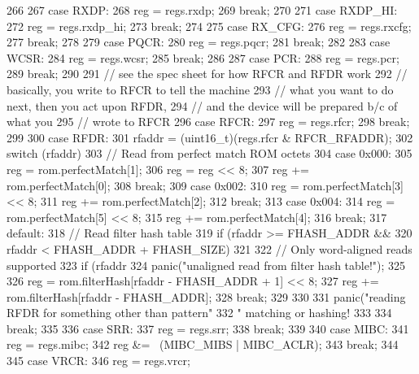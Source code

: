 \begin{DoxyCode}
{{266 
267           case RXDP:
268             reg = regs.rxdp;
269             break;
270 
271           case RXDP_HI:
272             reg = regs.rxdp_hi;
273             break;
274 
275           case RX_CFG:
276             reg = regs.rxcfg;
277             break;
278 
279           case PQCR:
280             reg = regs.pqcr;
281             break;
282 
283           case WCSR:
284             reg = regs.wcsr;
285             break;
286 
287           case PCR:
288             reg = regs.pcr;
289             break;
290 
291             // see the spec sheet for how RFCR and RFDR work
292             // basically, you write to RFCR to tell the machine
293             // what you want to do next, then you act upon RFDR,
294             // and the device will be prepared b/c of what you
295             // wrote to RFCR
296           case RFCR:
297             reg = regs.rfcr;
298             break;
299 
300           case RFDR:
301             rfaddr = (uint16_t)(regs.rfcr & RFCR_RFADDR);
302             switch (rfaddr) {
303               // Read from perfect match ROM octets
304               case 0x000:
305                 reg = rom.perfectMatch[1];
306                 reg = reg << 8;
307                 reg += rom.perfectMatch[0];
308                 break;
309               case 0x002:
310                 reg = rom.perfectMatch[3] << 8;
311                 reg += rom.perfectMatch[2];
312                 break;
313               case 0x004:
314                 reg = rom.perfectMatch[5] << 8;
315                 reg += rom.perfectMatch[4];
316                 break;
317               default:
318                 // Read filter hash table
319                 if (rfaddr >= FHASH_ADDR &&
320                     rfaddr < FHASH_ADDR + FHASH_SIZE) {
321 
322                     // Only word-aligned reads supported
323                     if (rfaddr %
324                         panic("unaligned read from filter hash table!");
325 
326                     reg = rom.filterHash[rfaddr - FHASH_ADDR + 1] << 8;
327                     reg += rom.filterHash[rfaddr - FHASH_ADDR];
328                     break;
329                 }
330 
331                 panic("reading RFDR for something other than pattern"
332                       " matching or hashing! %
333             }
334             break;
335 
336           case SRR:
337             reg = regs.srr;
338             break;
339 
340           case MIBC:
341             reg = regs.mibc;
342             reg &= ~(MIBC_MIBS | MIBC_ACLR);
343             break;
344 
345           case VRCR:
346             reg = regs.vrcr;
}}
\end{DoxyCode}

